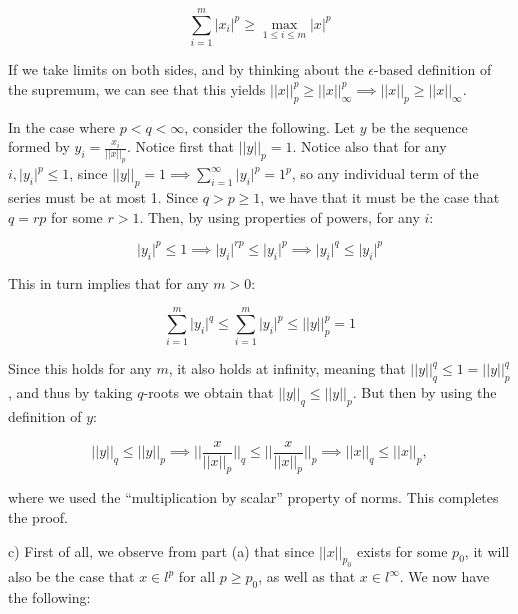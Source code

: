 \begin{solution}
    $$\sum_{i=1}^{m} \lvert x_i \rvert^p \geq \max_{1 \leq i \leq m} \lvert x \rvert^p$$

    If we take limits on both sides, and by thinking about the $\epsilon$-based definition of the supremum, we can see that this yields $\lvert \lvert x \rvert \rvert _p^p \geq \lvert \lvert x \rvert \rvert _\infty^p \implies \lvert \lvert x \rvert \rvert_p \geq \lvert \lvert x \rvert \rvert_\infty$.


    In the case where $p < q < \infty$, consider the following.
    Let $y$ be the sequence formed by $y_i = \frac{x_i}{\lvert \lvert x \rvert \rvert _p}$.
    Notice first that $\lvert \lvert y \rvert \rvert _p = 1$.
    Notice also that for any $i, \lvert y_i \rvert^p \leq 1$, since $\lvert \lvert y \rvert \rvert _p = 1 \implies \sum_{i=1}^{\infty} \lvert y_i \rvert^p = 1^p$, so any individual term of the series must be at most 1.
    Since $q > p \geq 1$, we have that it must be the case that $q = rp$ for some $r > 1$.
    Then, by using properties of powers, for any $i$:
    
    $$\lvert y_i \rvert^p \leq 1 \implies \lvert y_i \rvert^{rp} \leq \lvert y_i \rvert^p \implies \lvert y_i \rvert^q \leq \lvert y_i \rvert^p $$

    This in turn implies that for any $m > 0$:

    $$\sum_{i=1}^{m} \lvert y_i \rvert^q \leq \sum_{i=1}^{m} \lvert y_i \rvert^p \leq \lvert \lvert y \rvert \rvert _p^p = 1$$

    Since this holds for any $m$, it also holds at infinity, meaning that $\lvert \lvert y \rvert \rvert _q^q \leq 1 = \lvert \lvert y \rvert \rvert _p ^q$, and thus by taking $q$-roots we obtain that $\lvert \lvert y \rvert \rvert_q \leq \lvert \lvert y \rvert \rvert_p$.
    But then by using the definition of $y$:
    
    $$\lvert \lvert y \rvert \rvert_q \leq \lvert \lvert y \rvert \rvert _p \implies \Biggl\lvert \Biggl \lvert \frac{x}{\lvert \lvert x \rvert \rvert _p} \Biggr \rvert \Biggr \rvert _q \leq \Biggl \lvert \Biggl \lvert \frac{x}{\lvert \lvert x \rvert \rvert _p} \Biggr \rvert \Biggr \rvert _p \implies \lvert \lvert x \rvert \rvert _q \leq \lvert \lvert x \rvert \rvert _p,$$

    where we used the ``multiplication by scalar'' property of norms.
    This completes the proof.

    c) First of all, we observe from part (a) that since $\lvert \lvert x \rvert \rvert_{p_0}$ exists for some $p_0$, it will also be the case that $x \in l^p$ for all $p \geq p_0$, as well as that $x \in l^{\infty}$.
    We now have the following:


\end{solution}
